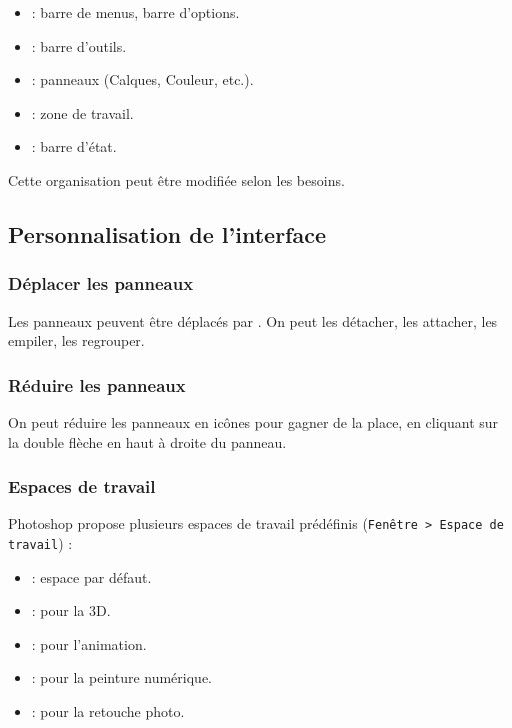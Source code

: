 \begin{itemize}
    \item {} : barre de menus, barre d'options.
    \item {} : barre d'outils.
    \item {} : panneaux (Calques, Couleur, etc.).
    \item {} : zone de travail.
    \item {} : barre d'état.
\end{itemize}

Cette organisation peut être modifiée selon les besoins.

\subsection{Personnalisation de l'interface}

\subsubsection{Déplacer les panneaux}

Les panneaux peuvent être déplacés par . On peut les détacher, les attacher, les empiler, les regrouper.

\subsubsection{Réduire les panneaux}

On peut réduire les panneaux en icônes pour gagner de la place, en cliquant sur la double flèche en haut à droite du panneau.

\subsubsection{Espaces de travail}

Photoshop propose plusieurs espaces de travail prédéfinis (\texttt{Fenêtre > Espace de travail}) :

\begin{itemize}
    \item {} : espace par défaut.
    \item {} : pour la 3D.
    \item {} : pour l'animation.
    \item {} : pour la peinture numérique.
    \item {} : pour la retouche photo.
\end{itemize}

